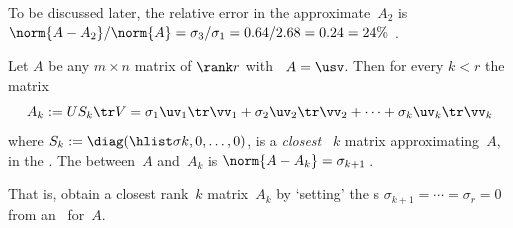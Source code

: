 \begin{example}
\begin{solution}
To be discussed later, the relative error in the approximate~\(A_2\) is \(\norm{A-A_2}/\norm{A} =\sigma_3/\sigma_1 =0.64/2.68 =0.24 =24\%\) \twodp.
\end{solution}
\end{example}









\begin{theorem} \label{thm:am}
Let \(A\) be any \(m\times n\) matrix of \(\rank r\) with \svd\ \(A=\usv\).  
Then for every \(k< r\) the matrix
\begin{equation}
A_k:=US_k\tr V =\sigma_1\uv_1\tr\vv_1 +\sigma_2\uv_2\tr\vv_2+\cdots +\sigma_k\uv_k\tr\vv_k
\label{eq:rankkA}
\end{equation}
where \(S_k:=\diag(\hlist\sigma k,0,\ldots,0)\), is a \emph{closest} ~\(k\) matrix approximating~\(A\), in the .
The  between~\(A\) and~\(A_k\) is \(\norm{A-A_k}=\sigma_{k+1}\)\,.
\end{theorem}

That is, obtain a closest rank~\(k\) matrix~\(A_k\) by `setting' the s \(\sigma_{k+1}=\cdots=\sigma_r=0\) from an \svd\ for~\(A\).

